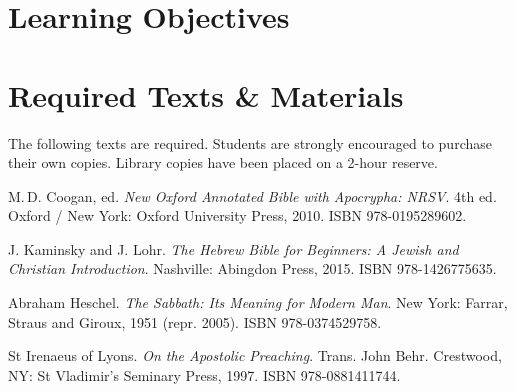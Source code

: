 \documentclass[titlepage]{article}
\newcommand\incl{../includes}
\begin{document}


  \section{Learning Objectives}
  \label{objectives}

  \edobject

\section{Required Texts \& Materials}
\label{texts}

The following texts are required. Students are strongly encouraged to
purchase their own copies. Library copies have been placed on a 2-hour
reserve.

\begingroup
\renewcommand{\section}[2]{}%
\begin{thebibliography}{Irenaeus}%

	 M.\,D. Coogan, ed.
    \emph{New Oxford Annotated Bible with Apocrypha: NRSV}. 4th ed.
    Oxford / New York: Oxford University Press, 2010.
    ISBN 978-0195289602.


	 J. Kaminsky and J. Lohr.
	\emph{The Hebrew Bible for Beginners: A Jewish and Christian Introduction}.
	Nashville: Abingdon Press, 2015.
	ISBN 978-1426775635.

	 Abraham Heschel.
	\emph{The Sabbath: Its Meaning for Modern Man}.
	New York: Farrar, Straus and Giroux, 1951 (repr. 2005).
	ISBN 978-0374529758.

	 St Irenaeus of Lyons.
	\emph{On the Apostolic Preaching}.
	Trans. John Behr.
	Crestwood, NY: St Vladimir’s Seminary Press, 1997.
	ISBN 978-0881411744.


\end{thebibliography}
\endgroup
\end{document}
